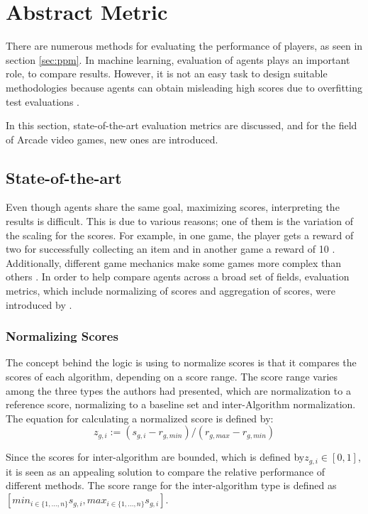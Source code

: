 \chapter{Abstract Metric}\label{sec:absmetric}
There are numerous methods for evaluating the performance of players, as seen in section \ref{sec:ppm}. In machine learning, evaluation of agents plays an important role, to compare results. However, it is not an easy task to design suitable methodologies because agents can obtain misleading high scores due to overfitting test evaluations \cite{5967363}.

In this section, state-of-the-art evaluation metrics are discussed, and for the field of Arcade video games, new ones are introduced.


\section{State-of-the-art}
Even though agents share the same goal, maximizing scores, interpreting the results is difficult. This is due to various reasons; one of them is the variation of the scaling for the scores. For example, in one game, the player gets a reward of two for successfully collecting an item and in another game a reward of 10 \cite{MsPacMan87:online, FishingD32:online}. Additionally, different game mechanics make some games more complex than others \cite{2012arXiv1207.4708B}. In order to help compare agents across a broad set of fields, evaluation metrics, which include normalizing of scores and aggregation of scores, were introduced by .

\subsection{Normalizing Scores}
The concept behind the logic \cite{2012arXiv1207.4708B} is using to normalize scores is that it compares the scores of each algorithm, depending on a score range. The score range varies among the three types the authors had presented, which are normalization to a reference score, normalizing to a baseline set and inter-Algorithm normalization.
The equation for calculating a normalized score is defined by:
\begin{equation}
z_{g,i} := (s_{g,i} - r_{g,min}) / (r_{g,max} - r_{g,min})
\label{eq:norm_score}
\end{equation}

Since the scores for inter-algorithm are bounded, which is defined by\(z_{g, i}\in [0, 1]\), it is seen as an appealing solution to compare the relative performance of different methods. The score range for the inter-algorithm type is defined as $[min_{i \in \{1,\dots , n\}}  s_{g,i}, max_{i \in \{1,\dots , n\}} s_{g,i}]$.

